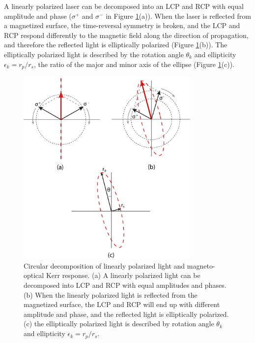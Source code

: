 \documentclass[pdflatex, sectionletters, 12pt]{pittetd}    %
\begin{document}
A linearly polarized laser can be decomposed into an LCP and RCP with equal amplitude and phase ($\sigma^+$ and $\sigma^-$ in Figure \ref{FIG:CircularDecompose}(a)). When the laser is reflected from a magnetized surface, the time-reversal symmetry is broken, and the LCP and RCP respond differently to the magnetic field along the direction of propagation, and therefore the reflected light is elliptically polarized (Figure \ref{FIG:CircularDecompose}(b)). The elliptically polarized light is described by the rotation angle $\theta_k$ and ellipticity $\epsilon_k = r_p/r_s$, the ratio of the major and minor axis of the ellipse (Figure \ref{FIG:CircularDecompose}(c)).
\\

\begin{figure}[p]
	\centering
	\includegraphics[width=0.8\textwidth]{Drawing/CircularDecompose.pdf}
	\caption{Circular decomposition of linearly polarized light and magneto-optical Kerr response. (a) A linearly polarized light can be decomposed into LCP and RCP with equal amplitudes and phases. (b) When the linearly polarized light is reflected from the magnetized surface, the LCP and RCP will end up with different amplitude and phase, and the reflected light is elliptically polarized. (c) the elliptically polarized light is described by rotation angle $\theta_k$ and ellipticity $\epsilon_k = r_p/r_s$.}
	\label{FIG:CircularDecompose}
\end{figure}
\end{document}
